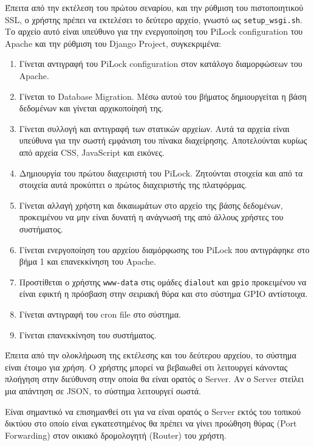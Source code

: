 Έπειτα από την εκτέλεση του πρώτου σεναρίου, και την ρύθμιση του πιστοποιητικού SSL, ο χρήστης πρέπει να εκτελέσει το δεύτερο αρχείο, γνωστό ως \verb|setup_wsgi.sh|. Το αρχείο αυτό είναι υπεύθυνο για την ενεργοποίηση του PiLock configuration του Apache και την ρύθμιση του Django Project, συγκεκριμένα:

\begin{enumerate}
	\item Γίνεται αντιγραφή του PiLock configuration στον κατάλογο διαμορφώσεων του Apache. 
	\item Γίνεται το Database Migration. Μέσω αυτού του βήματος δημιουργείται η βάση δεδομένων και γίνεται αρχικοποίησή της.
	\item Γίνεται συλλογή και αντιγραφή των στατικών αρχείων. Αυτά τα αρχεία είναι υπεύθυνα για την σωστή εμφάνιση του πίνακα διαχείρησης. Αποτελούνται κυρίως από αρχεία CSS, JavaScript και εικόνες.
	\item Δημιουργία του πρώτου διαχειριστή του PiLock. Ζητούνται στοιχεία και από τα στοιχεία αυτά προκύπτει ο πρώτος διαχειριστής της πλατφόρμας.
	\item Γίνεται αλλαγή χρήστη και δικαιωμάτων στο αρχείο της βάσης δεδομένων, προκειμένου να μην είναι δυνατή η ανάγνωσή της από άλλους χρήστες του συστήματος.
	\item Γίνεται ενεργοποίηση του αρχείου διαμόρφωσης του PiLock που αντιγράφηκε στο βήμα 1 και επανεκκίνηση του Apache.
	\item Προστίθεται ο χρήστης \verb|www-data| στις ομάδες \verb|dialout| και \verb|gpio| προκειμένου να είναι εφικτή η πρόσβαση στην σειριακή θύρα και στο σύστημα GPIO αντίστοιχα.
	\item Γίνεται αντιγραφή του cron file στο σύστημα.
	\item Γίνεται επανεκκίνηση του συστήματος.
\end{enumerate}

Έπειτα από την ολοκλήρωση της εκτέλεσης και του δεύτερου αρχείου, το σύστημα είναι έτοιμο για χρήση. Ο χρήστης μπορεί να βεβαιωθεί οτι λειτουργεί κάνοντας πλοήγηση στην διεύθυνση στην οποία θα είναι ορατός ο Server. Αν ο Server στείλει μια απάντηση σε JSON, το σύστημα λειτουργεί σωστά.

Είναι σημαντικό να επισημανθεί οτι για να είναι ορατός ο Server εκτός του τοπικού δικτύου στο οποίο είναι εγκατεστημένος θα πρέπει να γίνει προώθηση θύρας (Port Forwarding) στον οικιακό δρομολογητή (Router) του χρήστη.